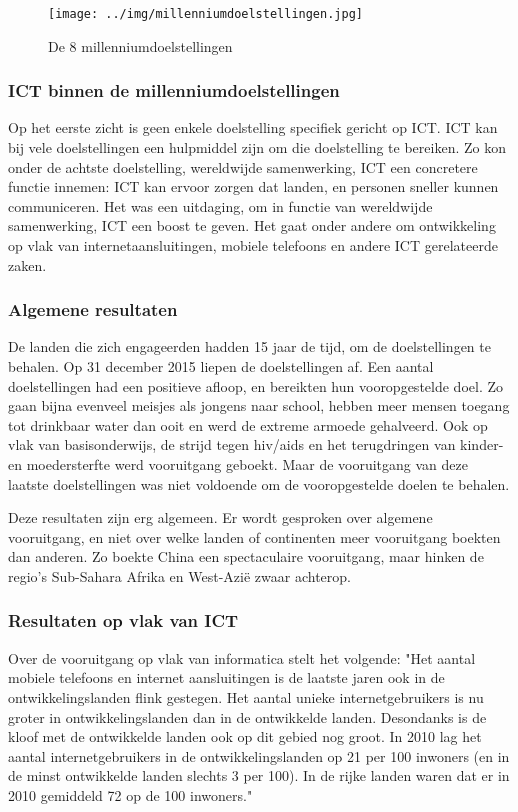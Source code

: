 \begin{figure}[h!]
	\texttt{[image: ../img/millenniumdoelstellingen.jpg]}
	\caption{De 8 millenniumdoelstellingen \autocite{NOS2015}}
	\label{milleniumdoelstellingen}
\end{figure}

 \subsubsection{ICT binnen de millenniumdoelstellingen}
 Op het eerste zicht is geen enkele doelstelling specifiek gericht op ICT. ICT kan bij vele doelstellingen een hulpmiddel zijn om die doelstelling te bereiken. Zo kon onder de achtste doelstelling, wereldwijde samenwerking, ICT een concretere functie innemen: ICT kan ervoor zorgen dat landen, en personen sneller kunnen communiceren. Het was een uitdaging, om in functie van wereldwijde samenwerking, ICT een boost te geven. Het gaat onder andere om ontwikkeling op vlak van internetaansluitingen, mobiele telefoons en andere ICT gerelateerde zaken. \autocite{NOS2015}
 
 \subsubsection{Algemene resultaten}
 De landen die zich engageerden hadden 15 jaar de tijd, om de doelstellingen te behalen. Op 31 december 2015 liepen de doelstellingen af.
 Een aantal doelstellingen had een positieve afloop, en bereikten hun vooropgestelde doel. Zo gaan bijna evenveel meisjes als jongens naar school, hebben meer mensen toegang tot drinkbaar water dan ooit en werd de extreme armoede gehalveerd. Ook op vlak van basisonderwijs, de strijd tegen hiv/aids en het terugdringen van kinder- en moedersterfte werd vooruitgang geboekt. Maar de vooruitgang van deze laatste doelstellingen was niet voldoende om de vooropgestelde doelen te behalen. \autocite{Tierens2014}

Deze resultaten zijn erg algemeen. Er wordt gesproken over algemene vooruitgang, en niet over welke landen of continenten meer vooruitgang boekten dan anderen. Zo boekte China een spectaculaire vooruitgang, maar hinken de regio's Sub-Sahara Afrika en West-Azië zwaar achterop. \autocite{Tierens2014}
 
 \subsubsection{Resultaten op vlak van ICT}
Over de vooruitgang op vlak van informatica stelt \autocite{Kampherbeek2012} het volgende: "Het aantal mobiele telefoons en internet aansluitingen is de laatste jaren ook in de ontwikkelingslanden flink gestegen. Het aantal unieke internetgebruikers is nu groter in ontwikkelingslanden dan in de ontwikkelde landen. Desondanks is de kloof met de ontwikkelde landen ook op dit gebied nog groot. In 2010 lag het aantal internetgebruikers in de ontwikkelingslanden op 21 per 100 inwoners (en in de minst ontwikkelde landen slechts 3 per 100). In de rijke landen waren dat er in 2010 gemiddeld 72 op de 100 inwoners."
 
